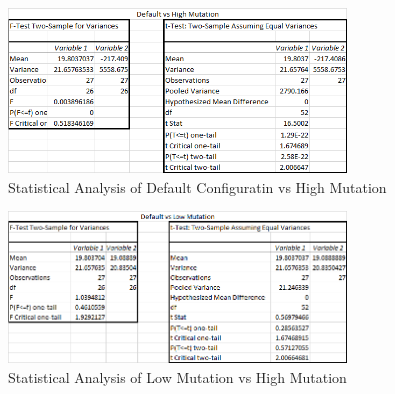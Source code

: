 \documentclass{article}
\begin{document}
\begin{flushleft}
\begin{figure}[h]
	\centering
	\includegraphics[width=0.8\textwidth]{statDefaultVsHighMut}
	\caption{Statistical Analysis of Default Configuratin vs High Mutation}
\end{figure}

\vspace{15mm}

\begin{figure}[h]
	\centering
	\includegraphics[width=0.8\textwidth]{statDefaultVsLowMut}
	\caption{Statistical Analysis of Low Mutation vs High Mutation}
\end{figure}
\end{flushleft}

\clearpage
\end{document}

